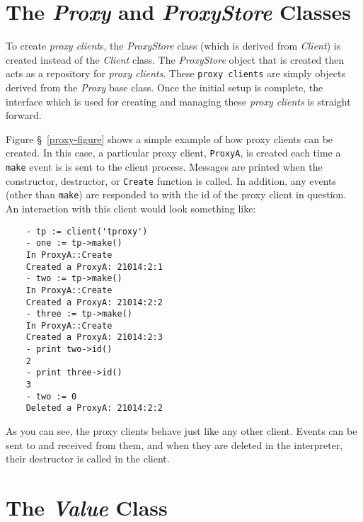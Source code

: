 \section{The {\em Proxy} and {\em ProxyStore} Classes}
\label{proxy-class}
\label{proxystore-class}

\begin{figure*}[tp]
\begin{footnotesize}
\begin{tgrind}[c]

\end{tgrind}
\end{footnotesize}
\caption{Proxy Clients}
\label{proxy-figure}
\end{figure*}

To create {\em proxy client}s, the {\em ProxyStore} class (which is derived from
{\em Client}) is created instead of the {\em Client} class.  The {\em ProxyStore}
object that is created then acts as a repository for {\em proxy clients}. These
{\tt proxy clients} are simply objects derived from the {\em Proxy} base class.
Once the initial setup is complete, the interface which is used for creating and
managing these {\em proxy clients} is straight forward.

Figure \S~\ref{proxy-figure} shows a simple example of how proxy clients can be
created. In this case, a particular proxy client, {\tt ProxyA}, is created each time
a {\tt make} event is is sent to the client process. Messages are printed
when the constructor, destructor, or {\tt Create} function is called. In addition,
any events (other than {\tt make}) are responded to with the id of the proxy
client in question. An interaction with this client would look something like:
\begin{verbatim}
    - tp := client('tproxy')
    - one := tp->make()
    In ProxyA::Create
    Created a ProxyA: 21014:2:1
    - two := tp->make() 
    In ProxyA::Create
    Created a ProxyA: 21014:2:2
    - three := tp->make()
    In ProxyA::Create
    Created a ProxyA: 21014:2:3
    - print two->id()
    2
    - print three->id()
    3
    - two := 0
    Deleted a ProxyA: 21014:2:2
\end{verbatim}
As you can see, the proxy clients behave just like any other client. Events can be
sent to and received from them, and when they are deleted in the interpreter, their
destructor is called in the client.

\section{The {\em Value} Class}
\label{value-class}

